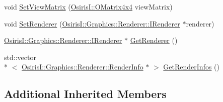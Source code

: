 \begin{DoxyCompactItemize}
\item 
void \hyperlink{class_osiris_i_1_1_graphics_1_1_scenes_1_1_camera_node_aa56a61e7896adb4eebd224f2609ffb80}{Set\-View\-Matrix} (\hyperlink{struct_osiris_i_1_1_o_matrix4x4}{Osiris\-I\-::\-O\-Matrix4x4} view\-Matrix)
\item 
void \hyperlink{class_osiris_i_1_1_graphics_1_1_scenes_1_1_camera_node_a5b682fc284612eb9d1fe9366b358ffdb}{Set\-Renderer} (\hyperlink{class_osiris_i_1_1_graphics_1_1_renderer_1_1_i_renderer}{Osiris\-I\-::\-Graphics\-::\-Renderer\-::\-I\-Renderer} $\ast$renderer)
\item 
\hyperlink{class_osiris_i_1_1_graphics_1_1_renderer_1_1_i_renderer}{Osiris\-I\-::\-Graphics\-::\-Renderer\-::\-I\-Renderer} $\ast$ \hyperlink{class_osiris_i_1_1_graphics_1_1_scenes_1_1_camera_node_a0b0f1f243e1e69245f75bb6ee45d401f}{Get\-Renderer} ()
\item 
std\-::vector\\*
$<$ \hyperlink{struct_osiris_i_1_1_graphics_1_1_renderer_1_1_render_info}{Osiris\-I\-::\-Graphics\-::\-Renderer\-::\-Render\-Info} $\ast$ $>$ \hyperlink{class_osiris_i_1_1_graphics_1_1_scenes_1_1_camera_node_afafc5846860bb18254559b5ad233e66e}{Get\-Render\-Infos} ()
\end{DoxyCompactItemize}
\subsection*{Additional Inherited Members}


